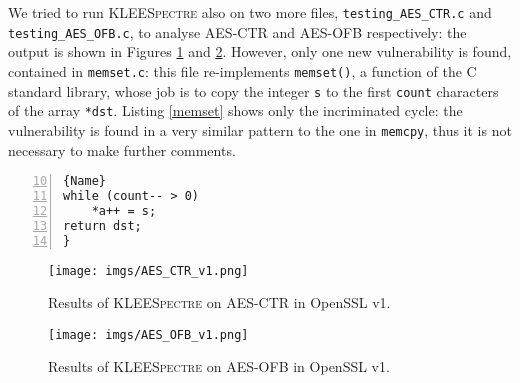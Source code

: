 \documentclass[target=mst,aauheader=aics]{thud}
\theoremstyle{definition}
\begin{document}
	We tried to run \textsc{KLEESpectre} also on two more files, \texttt{testing\_AES\_CTR.c} and \texttt{testing\_AES\_OFB.c}, to analyse AES-CTR and AES-OFB respectively: the output is shown in Figures \ref{fig:result_ctr_v1} and \ref{fig:result_ofb_v1}. However, only one new vulnerability is found, contained in \texttt{memset.c}: this file re-implements \texttt{memset()}, a function of the C standard library, whose job is to copy the integer \texttt{s} to the first \texttt{count} characters of the array \texttt{*dst}. Listing \ref{memset} shows only the incriminated cycle: the vulnerability is found in a very similar pattern to the one in \texttt{memcpy}, thus it is not necessary to make further comments.

	\begin{minipage}{.4\textwidth}
		\begin{lstlisting}[caption=\texttt{memcpy.c}, firstnumber=10, label=memset, numbers=left]{Name}
while (count-- > 0)
	*a++ = s;
return dst;
}
		\end{lstlisting}
	\end{minipage}
	\vspace{3mm}
	
	\begin{figure}[h]
		\centering
		\texttt{[image: imgs/AES\_CTR\_v1.png]}
		\captionsetup{width=.8\linewidth}
		\caption{Results of \textsc{KLEESpectre} on AES-CTR in OpenSSL v1.}
		\label{fig:result_ctr_v1} 
	\end{figure}

	\begin{figure}[h]
		\centering
		\texttt{[image: imgs/AES\_OFB\_v1.png]}
		\captionsetup{width=.8\linewidth}
		\caption{Results of \textsc{KLEESpectre} on AES-OFB in OpenSSL v1.}
		\label{fig:result_ofb_v1}
	\end{figure}
	
\end{document}
